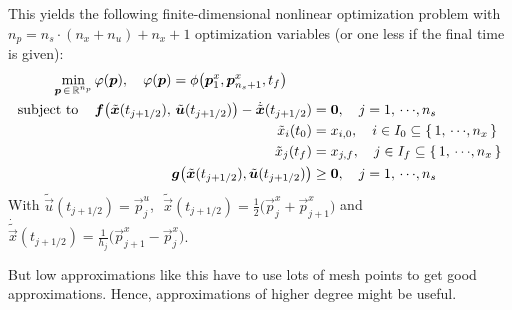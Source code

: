 				This yields the following finite-dimensional nonlinear optimization problem with \( n_p = n_s \cdot (n_x + n_u) + n_x + 1 \) optimization variables (or one less if the final time is given):
				\begin{align*}
					\min_{\bm{p} \,\in\, \mathbb{R}^{n_p}} &\, \varphi(\bm{p}),\quad \varphi(\bm{p}) = \phi\big(\bm{p}_1^x, \bm{p}_{n_s + 1}^x, t_f\big) \\
					\mathrm{subject~to}\quad &\,
						\begin{alignedat}[t]{2}
							\bm{f}\big( \tilde{\bm{x}}(t_{j + 1/2}),\, \tilde{\bm{u}}(t_{j + 1/2}) \big) - \dot{\tilde{\bm{x}}}(t_{j + 1/2}) &= \bm{0},\quad j = 1,\,\cdots\!,n_s \\
							\tilde{x}_i(t_0) &= x_{i, 0},\quad i \in I_0 \subseteq \{\, 1,\,\cdots\!,n_x \,\} \\
							\tilde{x}_j(t_f) &= x_{j, f},\quad j \in I_f \subseteq \{\, 1,\,\cdots\!,n_x \,\} \\
							\bm{g}\big( \tilde{\bm{x}}(t_{j + 1/2}), \tilde{\bm{u}}(t_{j + 1/2}) \big) &\geq \bm{0},\quad j = 1,\,\cdots\!,n_s
						\end{alignedat}
				\end{align*}
				With \( \tilde{\vec{u}}(t_{j + 1/2}) = \vec{p}_j^u \),\,\, \( \tilde{\vec{x}}(t_{j + 1/2}) = \frac{1}{2} \big( \vec{p}_j^x + \vec{p}_{j + 1}^x \big) \) and \( \dot{\tilde{\vec{x}}}(t_{j + 1/2}) = \frac{1}{h_j} \big( \vec{p}_{j + 1}^x - \vec{p}_j^x \big) \).

				But low approximations like this have to use lots of mesh points to get good approximations. Hence, approximations of higher degree might be useful.


